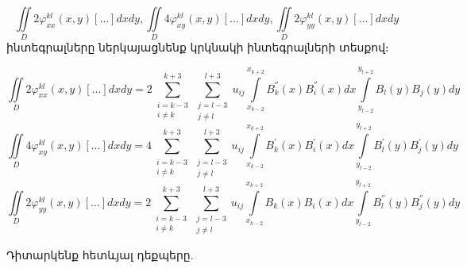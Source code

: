 \documentclass[fleqn, bachelor,subf,12pt,notitlepage]{disser}
\begin{document}
		$$\iint \limits_{D} 2\varphi_{xx}^{kl}(x,y)[\dots]dxdy, \iint \limits_{D} 4\varphi_{xy}^{kl}(x,y)[\dots]dxdy, \iint \limits_{D} 2\varphi_{yy}^{kl}(x,y)[\dots]dxdy$$
\noindent ինտեգրալները ներկայացնենք կրկնակի ինտեգրալների տեսքով։

$$\iint \limits_{D} 2\varphi_{xx}^{kl}(x,y)[\dots]dxdy= 2\sum_{\substack{i=k-3\\ i \neq k}}^{k+3}\sum_{\substack{j=l-3\\ j \neq l}}^{l+3} u_{ij}\int \limits_{x_{k-2}}^{x_{k+2}}B_{k}^{''}(x)B_{i}^{''}(x)dx \int \limits_{y_{l-2}}^{y_{l+2}}B_{l}(y)B_{j}(y)dy$$
$$\iint \limits_{D} 4\varphi_{xy}^{kl}(x,y)[\dots]dxdy= 4\sum_{\substack{i=k-3\\ i \neq k}}^{k+3}\sum_{\substack{j=l-3\\ j \neq l}}^{l+3}u_{ij}\int \limits_{x_{k-2}}^{x_{k+2}}B_{k}^{'}(x)B_{i}^{'}(x)dx \int \limits_{y_{l-2}}^{y_{l+2}}B_{l}^{'}(y)B_{j}^{'}(y)dy$$
$$\iint \limits_{D} 2\varphi_{yy}^{kl}(x,y)[\dots]dxdy= 2\sum_{\substack{i=k-3\\ i \neq k}}^{k+3}\sum_{\substack{j=l-3\\ j \neq l}}^{l+3}u_{ij}\int \limits_{x_{k-2}}^{x_{k+2}}B_{k}(x)B_{i}(x)dx \int \limits_{y_{l-2}}^{y_{l+2}}B_{l}^{''}(y)B_{j}^{''}(y)dy$$

\noindent Դիտարկենք  հետևյալ դեքպերը.
\end{document}
